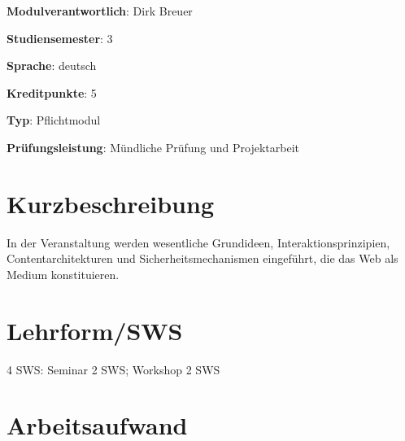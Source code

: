 \begin{modulHead}
\textbf{Modulverantwortlich}: Dirk
Breuer
\end{modulHead}
\begin{modulHead}
\textbf{Studiensemester}:
3
\end{modulHead}
\begin{modulHead}
\textbf{Sprache}:
deutsch
\end{modulHead}
\begin{modulHead}
\textbf{Kreditpunkte}:
5
\end{modulHead}
\begin{modulHead}
\textbf{Typ}:
Pflichtmodul
\end{modulHead}
\begin{modulHead}
\textbf{Prüfungsleistung}:
Mündliche Prüfung und Projektarbeit
\end{modulHead}


\hypertarget{kurzbeschreibungpathlabelmi-2017modulbeschreibungen-bachelorba_grundlagen-des-web}{%
\section*{Kurzbeschreibung\label{/mi-2017/modulbeschreibungen-bachelor/BA_Grundlagen-des-web}}\label{kurzbeschreibungpathlabelmi-2017modulbeschreibungen-bachelorba_grundlagen-des-web}}

In der Veranstaltung werden wesentliche Grundideen,
Interaktionsprinzipien, Contentarchitekturen und Sicherheitsmechanismen
eingeführt, die das Web als Medium konstituieren.

\hypertarget{lehrformswspathlabelmi-2017modulbeschreibungen-bachelorba_grundlagen-des-web}{%
\section*{Lehrform/SWS\label{/mi-2017/modulbeschreibungen-bachelor/BA_Grundlagen-des-web}}\label{lehrformswspathlabelmi-2017modulbeschreibungen-bachelorba_grundlagen-des-web}}

4 SWS: Seminar 2 SWS; Workshop 2 SWS

\hypertarget{arbeitsaufwandpathlabelmi-2017modulbeschreibungen-bachelorba_grundlagen-des-web}{%
\section*{Arbeitsaufwand\label{/mi-2017/modulbeschreibungen-bachelor/BA_Grundlagen-des-web}}\label{arbeitsaufwandpathlabelmi-2017modulbeschreibungen-bachelorba_grundlagen-des-web}}

